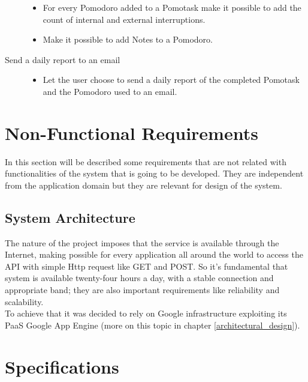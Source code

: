 \begin{description}
			\begin{itemize}

				\item For every Pomodoro added to a Pomotask make it possible to add the count of internal and external interruptions.

				\item Make it possible to add Notes to a Pomodoro.

			\end{itemize}

		\item[Send a daily report to an email]\hfill

			\begin{itemize}

				\item Let the user choose to send a daily report of the completed Pomotask and the Pomodoro used to an email.

			\end{itemize}


	\end{description}

	\section{Non-Functional Requirements}

	In this section will be described some requirements that are not related with functionalities of the system that is going to be developed. They are independent from the application domain but they are relevant for design of the system.\\

		\subsection{System Architecture}
		The nature of the project imposes that the service is available through the Internet, making possible for every application all around the world to access the API with simple Http request like GET and POST. So it's fundamental that system is available twenty-four hours a day, with a stable connection and appropriate band; they are also important requirements like reliability and scalability.\\
		To achieve that it was decided to rely on Google infrastructure exploiting its PaaS Google App Engine (more on this topic in chapter \ref{architectural_design}).


	\section{Specifications}

